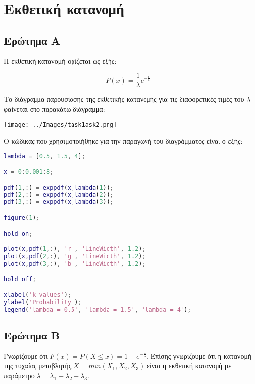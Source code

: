\documentclass[12pt]{article}
\begin{document}
\pagebreak

\section{Εκθετική κατανομή}

\subsection{Ερώτημα Α}
Η εκθετική κατανομή ορίζεται ως εξής:

\begin{equation}
    P(x) = \frac{1}{\lambda} e^{-\frac{x}{\lambda}}
\end{equation}

Το διάγραμμα παρουσίασης της εκθετικής κατανομής για τις διαφορετικές τιμές του $\lambda$ φαίνεται
στο παρακάτω διάγραμμα:

\begin{center}
    \texttt{[image: ../Images/task1ask2.png]}
\end{center}

Ο κώδικας που χρησιμοποιήθηκε για την παραγωγή του διαγράμματος είναι ο εξής:

\begin{lstlisting}[language=Matlab]
lambda = [0.5, 1.5, 4];

x = 0:0.001:8;

pdf(1,:) = exppdf(x,lambda(1));
pdf(2,:) = exppdf(x,lambda(2));
pdf(3,:) = exppdf(x,lambda(3));

figure(1);

hold on;

plot(x,pdf(1,:), 'r', 'LineWidth', 1.2);
plot(x,pdf(2,:), 'g', 'LineWidth', 1.2);
plot(x,pdf(3,:), 'b', 'LineWidth', 1.2);

hold off; 

xlabel('k values');
ylabel('Probability');
legend('lambda = 0.5', 'lambda = 1.5', 'lambda = 4');

\end{lstlisting}

\pagebreak

\subsection{Ερώτημα Β}
Γνωρίζουμε ότι $F(x) = P(X \leq x) = 1 - e^{-\frac{x}{\lambda}}$. Επίσης 
γνωρίζουμε ότι η κατανομή της τυχαίας μεταβλητής $X = min(X_1, X_2, X_3)$
είναι η εκθετική κατανομή με παράμετρο $\lambda = \lambda_1 + \lambda_2 + \lambda_3$.
\end{document}
